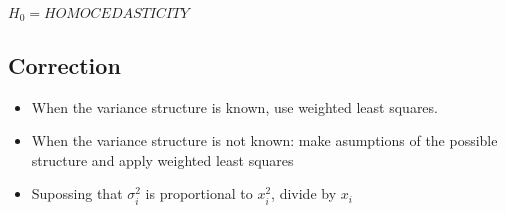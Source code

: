 \documentclass[10pt,landscape]{article}
\begin{document}
\begin{multicols}{3}
$H_0 = HOMOCEDASTICITY$
\subsection*{Correction}
\begin{itemize}
	\item When the variance structure is known, use weighted least squares.
	\item When the variance structure is not known: make asumptions of the possible structure and apply weighted least squares
	\item Supossing that $\sigma_i^2$ is proportional to $x_i^2$, divide by $x_i$
\end{itemize}

\end{multicols}
\end{document}
